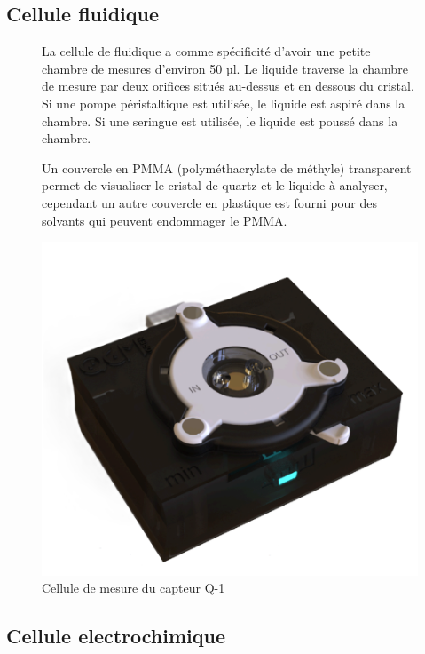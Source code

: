 \subsection{Cellule fluidique}
\begin{figure}[H]
    \centering
    \begin{minipage}{0.48\textwidth}
        \small
        La cellule de fluidique a comme spécificité d'avoir une petite chambre de mesures d'environ 50 µl.
        Le liquide traverse la chambre de mesure par deux orifices situés au-dessus et en dessous du cristal.
        Si une pompe péristaltique est utilisée, le liquide est aspiré dans la chambre.
        Si une seringue est utilisée, le liquide est poussé dans la chambre.

        Un couvercle en PMMA (polyméthacrylate de méthyle) transparent permet de visualiser le cristal de quartz et le liquide à analyser,
        cependant un autre couvercle en plastique est fourni pour des solvants qui peuvent endommager le PMMA.
    \end{minipage}\hfill
    \begin{minipage}{0.48\textwidth}
        \centering
        \includegraphics[width=\textwidth]{assets/figures/fluidic cell.png}
        \caption{Cellule de mesure du capteur Q-1 \cite{manual-openqcmQ1}}
        \label{fig:cellule de mesure Q-1}
    \end{minipage}
\end{figure}
\subsection{Cellule electrochimique}

